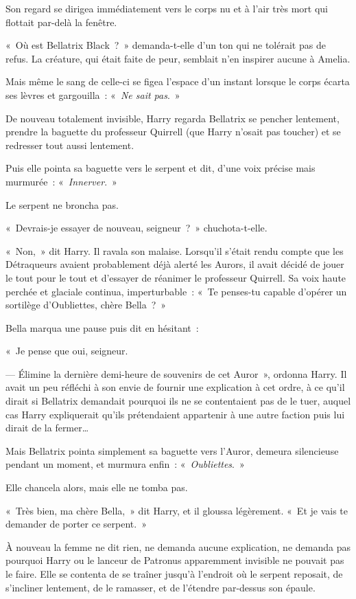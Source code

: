 Son regard se dirigea immédiatement vers le corps nu et à l'air très mort qui flottait par-delà la fenêtre.

«~Où est Bellatrix Black~?~»
demanda-t-elle d'un ton qui ne tolérait pas de refus.
La créature, qui était faite de peur, semblait n'en inspirer aucune à Amelia.

Mais même le sang de celle-ci se figea l'espace d'un instant lorsque le corps écarta ses lèvres et gargouilla~: «~\emph{Ne sait pas}.~»

\later

De nouveau totalement invisible, Harry regarda Bellatrix se pencher lentement, prendre la baguette du professeur Quirrell (que Harry n'osait pas toucher) et se redresser tout aussi lentement.

Puis elle pointa sa baguette vers le serpent et dit, d'une voix précise mais murmurée~: «~\emph{Innerver}.~»

Le serpent ne broncha pas.

«~Devrais-je essayer de nouveau, seigneur~?~»
chuchota-t-elle.

«~Non,~» dit Harry.
Il ravala son malaise.
Lorsqu'il s'était rendu compte que les Détraqueurs avaient probablement déjà alerté les Aurors, il avait décidé de jouer le tout pour le tout et d'essayer de réanimer le professeur Quirrell.
Sa voix haute perchée et glaciale continua, imperturbable~: «~Te penses-tu capable d'opérer un sortilège d'Oubliettes, chère Bella~?~»

Bella marqua une pause puis dit en hésitant~:

«~Je pense que oui, seigneur.

--- Élimine la dernière demi-heure de souvenirs de cet Auror~», ordonna Harry.
Il avait un peu réfléchi à son envie de fournir une explication à cet ordre, à ce qu'il dirait si Bellatrix demandait pourquoi ils ne se contentaient pas de le tuer, auquel cas Harry expliquerait qu'ils prétendaient appartenir à une autre faction puis lui dirait de la fermer…

Mais Bellatrix pointa simplement sa baguette vers l'Auror, demeura silencieuse pendant un moment, et murmura enfin~: «~\emph{Oubliettes}.~»

Elle chancela alors, mais elle ne tomba pas.

«~Très bien, ma chère Bella,~» dit Harry, et il gloussa légèrement.
«~Et je vais te demander de porter ce serpent.~»

À nouveau la femme ne dit rien, ne demanda aucune explication, ne demanda pas pourquoi Harry ou le lanceur de Patronus apparemment invisible ne pouvait pas le faire.
Elle se contenta de se traîner jusqu'à l'endroit où le serpent reposait, de s'incliner lentement, de le ramasser, et de l'étendre par-dessus son épaule.

